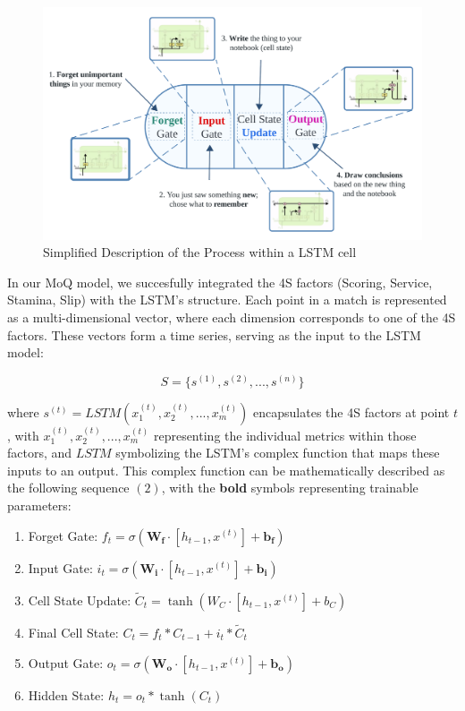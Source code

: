 \documentclass[12pt]{article}  %
\begin{document}
\begin{figure}[htbp]  %
	\centering  %
	\includegraphics[width=.8\textwidth]{LSTM.png} %
	\caption{Simplified Description of the Process within a LSTM cell \cite{12}} %
\end{figure}
\vspace{-0.2cm}

In our MoQ model, we succesfully integrated the 4S factors (Scoring, Service, Stamina, Slip) with the LSTM's structure. Each point in a match is represented as a multi-dimensional vector, where each dimension corresponds to one of the 4S factors. These vectors form a time series, serving as the input to the LSTM model:

\[ S = \{s^{(1)}, s^{(2)}, ..., s^{(n)}\} \]

where \( s^{(t)} = LSTM(x_1^{(t)}, x_2^{(t)}, ..., x_m^{(t)}) \) encapsulates the 4S factors at point \( t \), with \( x_1^{(t)}, x_2^{(t)}, ..., x_m^{(t)} \) representing the individual metrics within those factors, and \( LSTM \) symbolizing the LSTM's complex function that maps these inputs to an output. This complex function can be mathematically described as the following sequence $(2)$, with the \textbf{bold} symbols representing trainable parameters: 


\begin{enumerate}
	\centering
\item Forget Gate: \( f_t = \sigma(\mathbf{W_f} \cdot [h_{t-1}, x^{(t)}] + \mathbf{b_f}) \)
\item Input Gate: \( i_t = \sigma(\mathbf{W_i} \cdot [h_{t-1}, x^{(t)}] + \mathbf{b_i}) \)
\item Cell State Update: \( \tilde{C}_t = \tanh(W_C \cdot [h_{t-1}, x^{(t)}] + b_C) \)
\item Final Cell State: \( C_t = f_t \ast C_{t-1} + i_t \ast \tilde{C}_t \)
\item Output Gate: \( o_t = \sigma(\mathbf{W_o} \cdot [h_{t-1}, x^{(t)}] + \mathbf{b_o}) \)
\item Hidden State: \( h_t = o_t \ast \tanh(C_t) \)
\end{enumerate}
	
\end{document}
